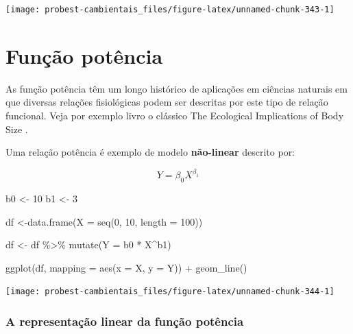 \documentclass[
]{book}
\newenvironment{Shaded}{\begin{snugshade}}{\end{snugshade}}
\newcommand{\AttributeTok}[1]{\textcolor[rgb]{0.77,0.63,0.00}{#1}}
\newcommand{\DecValTok}[1]{\textcolor[rgb]{0.00,0.00,0.81}{#1}}
\newcommand{\FunctionTok}[1]{\textcolor[rgb]{0.00,0.00,0.00}{#1}}
\newcommand{\NormalTok}[1]{#1}
\newcommand{\OtherTok}[1]{\textcolor[rgb]{0.56,0.35,0.01}{#1}}
\newcommand{\SpecialCharTok}[1]{\textcolor[rgb]{0.00,0.00,0.00}{#1}}
\begin{document}
\begin{center}\texttt{[image: probest-cambientais\_files/figure-latex/unnamed-chunk-343-1]} \end{center}

\hypertarget{funuxe7uxe3o-potuxeancia}{%
\section{Função potência}\label{funuxe7uxe3o-potuxeancia}}

As função potência têm um longo histórico de aplicações em ciências naturais em que diversas relações fisiológicas podem ser descritas por este tipo de relação funcional. Veja por exemplo livro o clássico The Ecological Implications of Body Size \citep{peters1986ecological}.

Uma relação potência é exemplo de modelo \textbf{não-linear} descrito por:

\[Y = \beta_{0}X^{\beta_{1}}\]

\begin{Shaded}
\begin{Highlighting}[]
\NormalTok{b0 }\OtherTok{\textless{}{-}} \DecValTok{10}
\NormalTok{b1 }\OtherTok{\textless{}{-}} \DecValTok{3}

\NormalTok{df }\OtherTok{\textless{}{-}}\FunctionTok{data.frame}\NormalTok{(}\AttributeTok{X =} \FunctionTok{seq}\NormalTok{(}\DecValTok{0}\NormalTok{, }\DecValTok{10}\NormalTok{, }\AttributeTok{length =} \DecValTok{100}\NormalTok{))}

\NormalTok{df }\OtherTok{\textless{}{-}}\NormalTok{ df }\SpecialCharTok{\%\textgreater{}\%} \FunctionTok{mutate}\NormalTok{(}\AttributeTok{Y =}\NormalTok{ b0 }\SpecialCharTok{*}\NormalTok{ X}\SpecialCharTok{\^{}}\NormalTok{b1)}

\FunctionTok{ggplot}\NormalTok{(df, }\AttributeTok{mapping =} \FunctionTok{aes}\NormalTok{(}\AttributeTok{x =}\NormalTok{ X, }\AttributeTok{y =}\NormalTok{ Y)) }\SpecialCharTok{+}
  \FunctionTok{geom\_line}\NormalTok{()}
\end{Highlighting}
\end{Shaded}

\begin{center}\texttt{[image: probest-cambientais\_files/figure-latex/unnamed-chunk-344-1]} \end{center}

\hypertarget{a-representauxe7uxe3o-linear-da-funuxe7uxe3o-potuxeancia}{%
\subsubsection*{A representação linear da função potência}\label{a-representauxe7uxe3o-linear-da-funuxe7uxe3o-potuxeancia}}
\end{document}
